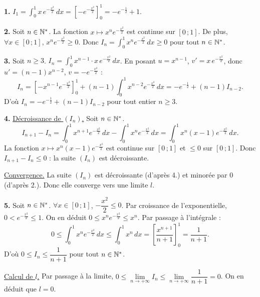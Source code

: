 \documentclass[11pt]{article}
\begin{document}

\textbf{1.} $\displaystyle I_1 = \int_0^1 x\,e^{-\frac{x^2}{2}}\,dx = \left[-e^{-\frac{x^2}{2}}\right]_0^1 = -e^{-\frac{1}{2}} + 1$.

\textbf{2.} Soit $n \in \mathbb{N}^*$. La fonction $x \mapsto x^n e^{-\frac{x^2}{2}}$ est continue sur $[0\,;1]$. De plus, $\forall x \in [0\,;1]$, $x^n e^{-\frac{x^2}{2}} \ge 0$. Donc $I_n = \displaystyle\int_0^1 x^n e^{-\frac{x^2}{2}}\,dx \ge 0$ pour tout $n \in \mathbb{N}^*$.

\textbf{3.} Soit $n \ge 3$. $I_n = \displaystyle\int_0^1 x^{n-1} \cdot x\,e^{-\frac{x^2}{2}}\,dx$. En posant $u = x^{n-1}$, $v' = x\,e^{-\frac{x^2}{2}}$, donc $u' = (n-1)x^{n-2}$, $v = -e^{-\frac{x^2}{2}}$ :
\[ I_n = \left[-x^{n-1}e^{-\frac{x^2}{2}}\right]_0^1 + (n-1)\int_0^1 x^{n-2}e^{-\frac{x^2}{2}}\,dx = -e^{-\frac{1}{2}} + (n-1)I_{n-2}. \]
D'où $I_n = -e^{-\frac{1}{2}} + (n-1)I_{n-2}$ pour tout entier $n \ge 3$.

\textbf{4.} \underline{Décroissance de $(I_n)$.} Soit $n \in \mathbb{N}^*$.
\[ I_{n+1} - I_n = \int_0^1 x^{n+1}e^{-\frac{x^2}{2}}\,dx - \int_0^1 x^n e^{-\frac{x^2}{2}}\,dx = \int_0^1 x^n(x - 1)e^{-\frac{x^2}{2}}\,dx. \]
La fonction $x \mapsto x^n(x-1)e^{-\frac{x^2}{2}}$ est continue sur $[0\,;1]$ et $\le 0$ sur $[0\,;1]$. Donc $I_{n+1} - I_n \le 0$ : la suite $(I_n)$ est décroissante.

\underline{Convergence.} La suite $(I_n)$ est décroissante (d'après 4.) et minorée par 0 (d'après 2.). Donc elle converge vers une limite $l$.

\textbf{5.} Soit $n \in \mathbb{N}^*$. $\forall x \in [0\,;1]$, $-\dfrac{x^2}{2} \le 0$. Par croissance de l'exponentielle, $0 < e^{-\frac{x^2}{2}} \le 1$. On en déduit $0 \le x^n e^{-\frac{x^2}{2}} \le x^n$. Par passage à l'intégrale :
\[ 0 \le \int_0^1 x^n e^{-\frac{x^2}{2}}\,dx \le \int_0^1 x^n\,dx = \left[\frac{x^{n+1}}{n+1}\right]_0^1 = \frac{1}{n+1}. \]
D'où $0 \le I_n \le \dfrac{1}{n+1}$ pour tout $n \in \mathbb{N}^*$.

\underline{Calcul de $l$.} Par passage à la limite, $0 \le \lim\limits_{n\to+\infty} I_n \le \lim\limits_{n\to+\infty}\dfrac{1}{n+1} = 0$. On en déduit que $l = 0$.

\prob{}
\end{document}
